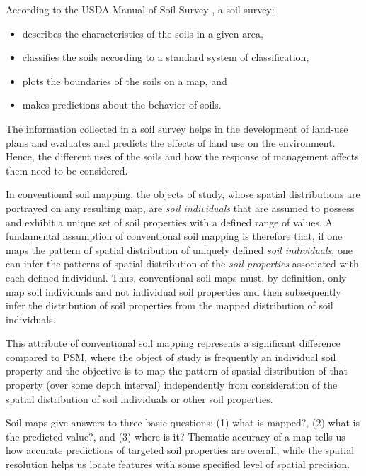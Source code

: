 \documentclass[11pt]{krantz}
\theoremstyle{definition}
\theoremstyle{definition}
\theoremstyle{definition}
\theoremstyle{remark}
\begin{document}
According to the USDA Manual of Soil Survey \citep{SSDS1993}, a soil
survey:

\begin{itemize}
\item
  describes the characteristics of the soils in a given area,
\item
  classifies the soils according to a standard system of classification,
\item
  plots the boundaries of the soils on a map, and
\item
  makes predictions about the behavior of soils.
\end{itemize}

The information collected in a soil survey helps in the development of
land-use plans and evaluates and predicts the effects of land use on the
environment. Hence, the different uses of the soils and how the response
of management affects them need to be considered.

In conventional soil mapping, the objects of study, whose spatial
distributions are portrayed on any resulting map, are \emph{soil
individuals} that are assumed to possess and exhibit a unique set of
soil properties with a defined range of values. A fundamental assumption
of conventional soil mapping is therefore that, if one maps the pattern
of spatial distribution of uniquely defined \emph{soil individuals}, one
can infer the patterns of spatial distribution of the \emph{soil
properties} associated with each defined individual. Thus, conventional
soil maps must, by definition, only map soil individuals and not
individual soil properties \citep{SSDS1993} and then subsequently infer
the distribution of soil properties from the mapped distribution of soil
individuals.

This attribute of conventional soil mapping represents a significant
difference compared to PSM, where the object of study is frequently an
individual soil property and the objective is to map the pattern of
spatial distribution of that property (over some depth interval)
independently from consideration of the spatial distribution of soil
individuals or other soil properties.

Soil maps give answers to three basic questions: (1) what is mapped?,
(2) what is the predicted value?, and (3) where is it? Thematic accuracy
of a map tells us how accurate predictions of targeted soil properties
are overall, while the spatial resolution helps us locate features with
some specified level of spatial precision.
\end{document}
